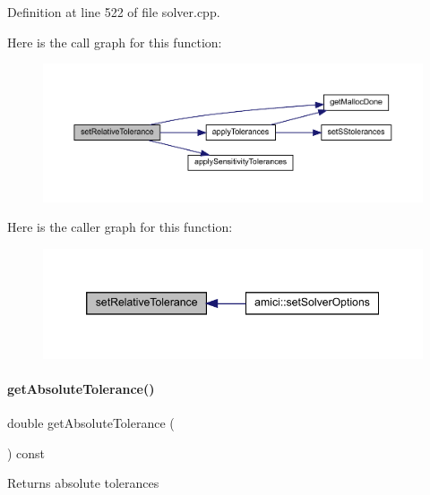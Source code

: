 Definition at line 522 of file solver.\+cpp.

Here is the call graph for this function\+:
\nopagebreak
\begin{figure}[H]
\begin{center}
\leavevmode
\includegraphics[width=350pt]{classamici_1_1_solver_afb5f0c48f24e4bc3efad8ef599adde56_cgraph}
\end{center}
\end{figure}
Here is the caller graph for this function\+:
\nopagebreak
\begin{figure}[H]
\begin{center}
\leavevmode
\includegraphics[width=346pt]{classamici_1_1_solver_afb5f0c48f24e4bc3efad8ef599adde56_icgraph}
\end{center}
\end{figure}
\mbox{\label{classamici_1_1_solver_a676df944b6737474dd4ef74fe9212f3e}} 
\paragraph{\texorpdfstring{get\+Absolute\+Tolerance()}{getAbsoluteTolerance()}}
{\footnotesize\ttfamily double get\+Absolute\+Tolerance (\begin{DoxyParamCaption}{ }\end{DoxyParamCaption}) const}

\begin{DoxyReturn}{Returns}
absolute tolerances 
\end{DoxyReturn}


